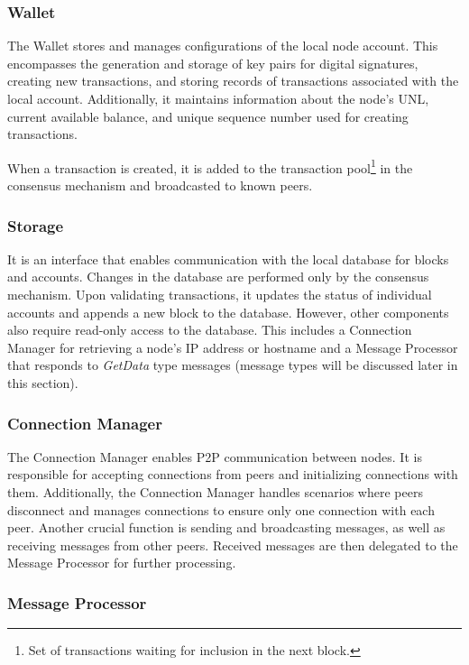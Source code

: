 \subsubsection{Wallet}

The Wallet stores and manages configurations of the local node account. This encompasses the generation and storage of key pairs for digital signatures, creating new transactions, and storing records of transactions associated with the local account. Additionally, it maintains information about the node's UNL, current available balance, and unique sequence number used for creating transactions.

When a transaction is created, it is added to the transaction pool\footnote{Set of transactions waiting for inclusion in the next block.} in the consensus mechanism and broadcasted to known peers.

\subsubsection{Storage}

It is an interface that enables communication with the local database for blocks and accounts. Changes in the database are performed only by the consensus mechanism. Upon validating transactions, it updates the status of individual accounts and appends a new block to the database. However, other components also require read-only access to the database. This includes a Connection Manager for retrieving a node's IP address or hostname and a Message Processor that responds to \emph{GetData} type messages (message types will be discussed later in this section).

\subsubsection{Connection Manager}

The Connection Manager enables P2P communication between nodes. It is responsible for accepting connections from peers and initializing connections with them. Additionally, the Connection Manager handles scenarios where peers disconnect and manages connections to ensure only one connection with each peer. Another crucial function is sending and broadcasting messages, as well as receiving messages from other peers. Received messages are then delegated to the Message Processor for further processing.

\subsubsection{Message Processor}

